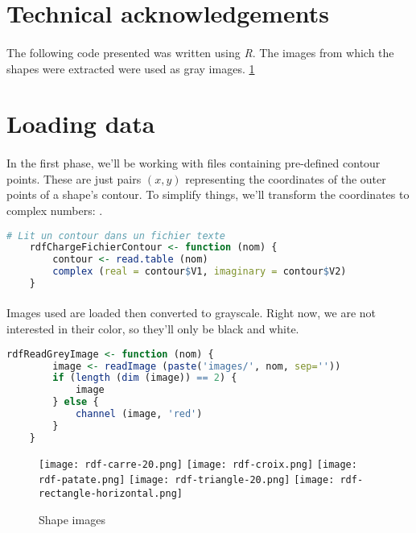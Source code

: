\section{Technical acknowledgements}
\paragraph{}
The following code presented was written using \emph{R}. The images from which the shapes were extracted were used as gray images. \ref{fig:gray-images}

\section{Loading data}
\paragraph{}
In the first phase, we'll be working with files containing pre-defined contour points.
These are just pairs $(x, y)$ representing the coordinates of the outer points of a shape's contour.
To simplify things, we'll transform the coordinates to complex numbers: \cite{complex_number}.

\begin{lstlisting}[language=R, caption=Loading outer contour points]
    # Lit un contour dans un fichier texte
    rdfChargeFichierContour <- function (nom) {
        contour <- read.table (nom)
        complex (real = contour$V1, imaginary = contour$V2)
    }
\end{lstlisting}

\paragraph{}
Images used are loaded then converted to grayscale. Right now, we are not interested in their color, so they'll only be black and white.

\begin{lstlisting}[language=R, caption=Loading images]
    rdfReadGreyImage <- function (nom) {
        image <- readImage (paste('images/', nom, sep=''))
        if (length (dim (image)) == 2) {
            image
        } else {
            channel (image, 'red')
        }
    }
\end{lstlisting}

\begin{figure}[ht]
    \centering
    \texttt{[image: rdf-carre-20.png]}
    \texttt{[image: rdf-croix.png]}
    \texttt{[image: rdf-patate.png]}
    \texttt{[image: rdf-triangle-20.png]}
    \texttt{[image: rdf-rectangle-horizontal.png]}
    \caption{Shape images}
    \label{fig:gray-images}
\end{figure}

